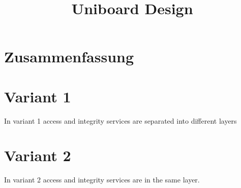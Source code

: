 \documentclass[bibtotoc,halfparskip,oneside]{scrreprt}
\begin{document}
\title{Uniboard Design}
\maketitle

\begin{versionhistory}
\end{versionhistory}

\chapter*{Zusammenfassung}


\tableofcontents

\chapter{Variant 1}
In variant 1 access and integrity services are separated into different layers 


\chapter{Variant 2}
In variant 2 access and integrity services are in the same layer.
 
\end{document}
